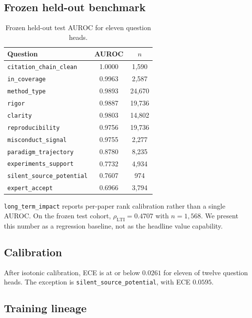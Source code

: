 \documentclass[11pt]{article}
\begin{document}
\subsection{Frozen held-out benchmark}

\begin{table}[t]
\centering
\begin{tabular}{@{}lcc@{}}
\toprule
Question & AUROC & \(n\) \\
\midrule
\texttt{citation\_chain\_clean} & 1.0000 & 1{,}590 \\
\texttt{in\_coverage} & 0.9963 & 2{,}587 \\
\texttt{method\_type} & 0.9893 & 24{,}670 \\
\texttt{rigor} & 0.9887 & 19{,}736 \\
\texttt{clarity} & 0.9803 & 14{,}802 \\
\texttt{reproducibility} & 0.9756 & 19{,}736 \\
\texttt{misconduct\_signal} & 0.9755 & 2{,}277 \\
\texttt{paradigm\_trajectory} & 0.8780 & 8{,}235 \\
\texttt{experiments\_support} & 0.7732 & 4{,}934 \\
\texttt{silent\_source\_potential} & 0.7607 & 974 \\
\texttt{expert\_accept} & 0.6966 & 3{,}794 \\
\bottomrule
\end{tabular}
\caption{Frozen held-out test AUROC for eleven question heads.}
\label{tab:auc}
\end{table}

\texttt{long\_term\_impact} reports per-paper rank calibration rather than a
single AUROC. On the frozen test cohort,
\(\rho_{\mathrm{LTI}}=0.4707\) with \(n=1{,}568\). We present this number as a
regression baseline, not as the headline value capability.

\subsection{Calibration}

After isotonic calibration, ECE is at or below \(0.0261\) for eleven of twelve
question heads. The exception is \texttt{silent\_source\_potential}, with ECE
\(0.0595\).

\subsection{Training lineage}
\end{document}
